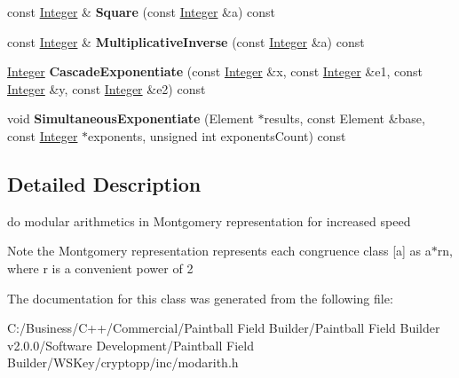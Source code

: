 \begin{DoxyCompactItemize}
\item 
\hypertarget{class_montgomery_representation_a1ec518d88d30ea5adad49ae6d52ed0b7}{
const \hyperlink{class_integer}{Integer} \& {\bfseries Square} (const \hyperlink{class_integer}{Integer} \&a) const }
\label{class_montgomery_representation_a1ec518d88d30ea5adad49ae6d52ed0b7}

\item 
\hypertarget{class_montgomery_representation_af244449d02e097520520e2c7255ec526}{
const \hyperlink{class_integer}{Integer} \& {\bfseries MultiplicativeInverse} (const \hyperlink{class_integer}{Integer} \&a) const }
\label{class_montgomery_representation_af244449d02e097520520e2c7255ec526}

\item 
\hypertarget{class_montgomery_representation_acd3a38b45b2e1c3d1dd9e1bb43d500fe}{
\hyperlink{class_integer}{Integer} {\bfseries CascadeExponentiate} (const \hyperlink{class_integer}{Integer} \&x, const \hyperlink{class_integer}{Integer} \&e1, const \hyperlink{class_integer}{Integer} \&y, const \hyperlink{class_integer}{Integer} \&e2) const }
\label{class_montgomery_representation_acd3a38b45b2e1c3d1dd9e1bb43d500fe}

\item 
\hypertarget{class_montgomery_representation_a031b2e547e3c748947e295e6e44b404c}{
void {\bfseries SimultaneousExponentiate} (Element $\ast$results, const Element \&base, const \hyperlink{class_integer}{Integer} $\ast$exponents, unsigned int exponentsCount) const }
\label{class_montgomery_representation_a031b2e547e3c748947e295e6e44b404c}

\end{DoxyCompactItemize}


\subsection{Detailed Description}
do modular arithmetics in Montgomery representation for increased speed \begin{DoxyNote}{Note}
the Montgomery representation represents each congruence class \mbox{[}a\mbox{]} as a$\ast$rn, where r is a convenient power of 2 
\end{DoxyNote}


The documentation for this class was generated from the following file:\begin{DoxyCompactItemize}
\item 
C:/Business/C++/Commercial/Paintball Field Builder/Paintball Field Builder v2.0.0/Software Development/Paintball Field Builder/WSKey/cryptopp/inc/modarith.h\end{DoxyCompactItemize}
